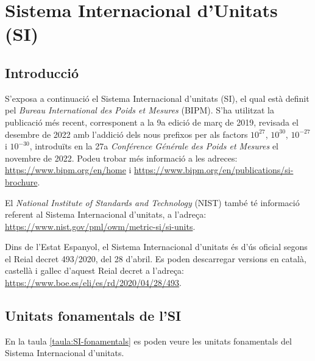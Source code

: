 \chapter{Sistema Internacional d'Unitats (SI)}\label{sec:SI}

\section{Introducció}\label{sec:SI-intro}
S'exposa a continuació el Sistema
Internacional d'unitats (SI), el qual està definit pel  \textit{Bureau
International des Poids et Mesures} (BIPM). S'ha utilitzat la publicació més recent, corresponent a la 9a edició de març de 2019, revisada el desembre de  2022 amb l'addició dels nous prefixos per als factors $10^{27}$,  $10^{30}$,  $10^{-27}$ i  $10^{-30}$, introduïts en la 27a \textit{Conférence Générale des Poids et Mesures} el novembre de 2022. Podeu trobar més informació a les adreces: \href{https://www.bipm.org/en/home/}{https://www.bipm.org/en/home} i \href{https://www.bipm.org/en/publications/si-brochure/}{https://www.bipm.org/en/publications/si-brochure}. 

El  \textit{National Institute of Standards and Technology} (NIST) també té informació referent al Sistema
Internacional d'unitats, a l'adreça: \href{https://www.nist.gov/pml/owm/metric-si/si-units}
{https://www.nist.gov/pml/owm/metric-si/si-units}.

Dins de l'Estat Espanyol, el Sistema Internacional d'unitats és d'ús oficial segons el Reial decret 493/2020, del 28 d'abril. Es poden descarregar versions en català, castellà i gallec d'aquest Reial decret a l'adreça: \href{https://www.boe.es/eli/es/rd/2020/04/28/493}
{https://www.boe.es/eli/es/rd/2020/04/28/493}.

\section{Unitats fonamentals de l'SI}

En la taula \vref{taula:SI-fonamentals} es poden veure les unitats
fonamentals del Sistema Internacional d'unitats.

